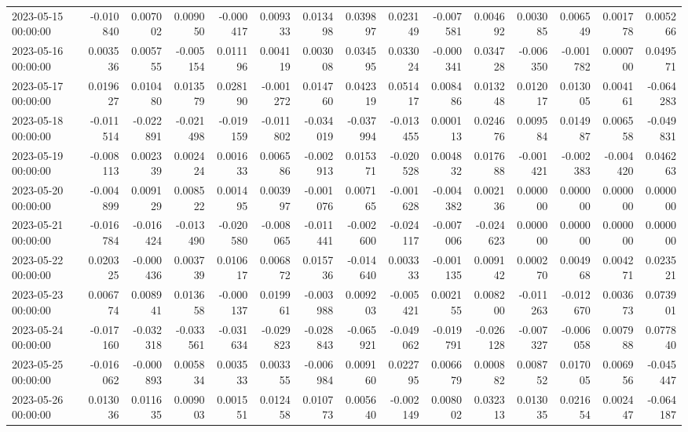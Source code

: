 \begin{tabular}{lrrrrrrrrrrrrrr}
2023-05-15 00:00:00 & -0.010840 & 0.007002 & 0.009050 & -0.000417 & 0.009333 & 0.013498 & 0.039897 & 0.023149 & -0.007581 & 0.004692 & 0.003085 & 0.006549 & 0.001778 & 0.005266 \\
2023-05-16 00:00:00 & 0.003536 & 0.005755 & -0.005154 & 0.011196 & 0.004119 & 0.003008 & 0.034595 & 0.033024 & -0.000341 & 0.034728 & -0.006350 & -0.001782 & 0.000700 & 0.049571 \\
2023-05-17 00:00:00 & 0.019627 & 0.010480 & 0.013579 & 0.028190 & -0.001272 & 0.014760 & 0.042319 & 0.051417 & 0.008486 & 0.013248 & 0.012017 & 0.013005 & 0.004161 & -0.064283 \\
2023-05-18 00:00:00 & -0.011514 & -0.022891 & -0.021498 & -0.019159 & -0.011802 & -0.034019 & -0.037994 & -0.013455 & 0.000113 & 0.024676 & 0.009584 & 0.014987 & 0.006558 & -0.049831 \\
2023-05-19 00:00:00 & -0.008113 & 0.002339 & 0.002424 & 0.001633 & 0.006586 & -0.002913 & 0.015371 & -0.020528 & 0.004832 & 0.017688 & -0.001421 & -0.002383 & -0.004420 & 0.046263 \\
2023-05-20 00:00:00 & -0.004899 & 0.009129 & 0.008522 & 0.001495 & 0.003997 & -0.001076 & 0.007165 & -0.001628 & -0.004382 & 0.002136 & 0.000000 & 0.000000 & 0.000000 & 0.000000 \\
2023-05-21 00:00:00 & -0.016784 & -0.016424 & -0.013490 & -0.020580 & -0.008065 & -0.011441 & -0.002600 & -0.024117 & -0.007006 & -0.024623 & 0.000000 & 0.000000 & 0.000000 & 0.000000 \\
2023-05-22 00:00:00 & 0.020325 & -0.000436 & 0.003739 & 0.010617 & 0.006872 & 0.015736 & -0.014640 & 0.003333 & -0.001135 & 0.009142 & 0.000270 & 0.004968 & 0.004271 & 0.023521 \\
2023-05-23 00:00:00 & 0.006774 & 0.008941 & 0.013658 & -0.000137 & 0.019961 & -0.003988 & 0.009203 & -0.005421 & 0.002155 & 0.008200 & -0.011263 & -0.012670 & 0.003673 & 0.073901 \\
2023-05-24 00:00:00 & -0.017160 & -0.032318 & -0.033561 & -0.031634 & -0.029823 & -0.028843 & -0.065921 & -0.049062 & -0.019791 & -0.026128 & -0.007327 & -0.006058 & 0.007988 & 0.077840 \\
2023-05-25 00:00:00 & -0.016062 & -0.000893 & 0.005834 & 0.003533 & 0.003355 & -0.006984 & 0.009160 & 0.022795 & 0.006679 & 0.000882 & 0.008752 & 0.017005 & 0.006956 & -0.045447 \\
2023-05-26 00:00:00 & 0.013036 & 0.011635 & 0.009003 & 0.001551 & 0.012458 & 0.010773 & 0.005640 & -0.002149 & 0.008002 & 0.032313 & 0.013035 & 0.021654 & 0.002447 & -0.064187 \\

\end{tabular}
